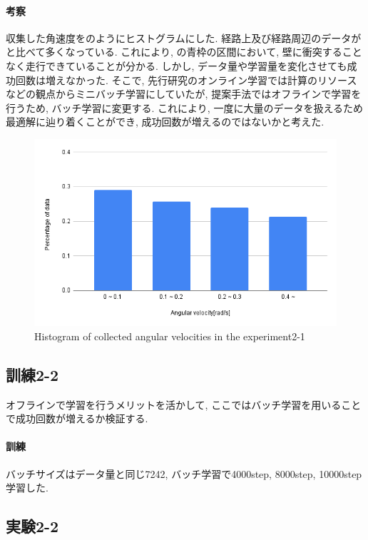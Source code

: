 \newpage
\paragraph{考察}
収集した角速度をのようにヒストグラムにした. 経路上及び経路周辺のデータがと比べて多くなっている. これにより, の青枠の区間において, 壁に衝突することなく走行できていることが分かる. しかし, データ量や学習量を変化させても成功回数は増えなかった. そこで, 先行研究のオンライン学習では計算のリソースなどの観点からミニバッチ学習にしていたが, 提案手法ではオフラインで学習を行うため, バッチ学習に変更する. これにより, 一度に大量のデータを扱えるため最適解に辿り着くことができ, 成功回数が増えるのではないかと考えた. 

\begin{figure}[h]
  \centering
  \includegraphics[keepaspectratio, scale=0.6]{images/exp2.png}
  \caption{Histogram of collected angular velocities in the experiment2-1}
  \label{Fig:exp2}
  \end{figure}

\newpage
\subsection{訓練2-2}
オフラインで学習を行うメリットを活かして, ここではバッチ学習を用いることで成功回数が増えるか検証する.  

\paragraph{訓練}
バッチサイズはデータ量と同じ7242, バッチ学習で4000step, 8000step, 10000step学習した. 

\newpage
\subsection{実験2-2}

